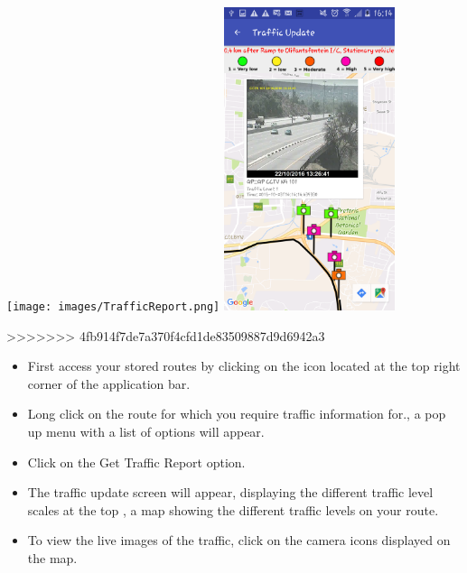 \documentclass[a4paper,12pt]{article}
\begin{document}
\begin{center}
\texttt{[image: images/TrafficReport.png]}
\includegraphics[width=50mm, scale=0.5]{images/TrafficReport4.png}
\end{center}
>>>>>>> 4fb914f7de7a370f4cfd1de83509887d9d6942a3
\begin{itemize}
    \item First access your stored routes by  clicking on the icon located at the top right corner of the application bar. 
    \item Long click on the route for which you require traffic information for., a pop up menu with a list of options will appear.
    \item Click on the Get Traffic Report option.
    \item The traffic update screen will appear, displaying the different traffic level scales at the top , a map showing the different   traffic levels on your route. 
    \item To view the live images of the traffic, click on the camera icons displayed on the map.
\end{itemize}
\end{document}
